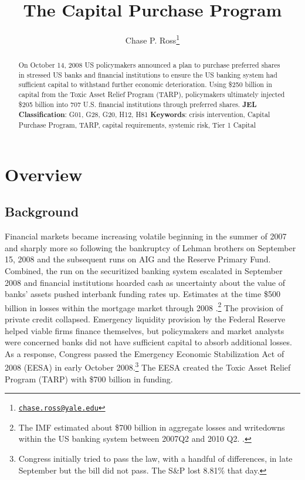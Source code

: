 \documentclass[12pt]{article}
\begin{document}
	\lhead{}
	\rhead{}
	\renewcommand{\headrulewidth}{0.0pt}
	\renewcommand{\footrulewidth}{0.0pt}

\title{The Capital Purchase Program}
\author{Chase P. Ross\thanks{\texttt{\href{mailto:chase.ross@yale.edu}{chase.ross@yale.edu}}}}
\date{}


\maketitle

\begin{abstract}
On October 14, 2008 US policymakers announced a plan to purchase preferred shares in stressed US banks and financial institutions to ensure the US banking system had sufficient capital to withstand further economic deterioration. Using \$250 billion in capital from the Toxic Asset Relief Program (TARP), policymakers ultimately injected \$205 billion into 707 U.S. financial institutions through preferred shares. 
\newline
\newline
\textbf{JEL Classification}: G01, G28, G20, H12, H81
\newline
\textbf{Keywords}: crisis intervention, Capital Purchase Program, TARP,  capital requirements, systemic risk, Tier 1 Capital

\end{abstract}
\newpage
\tableofcontents
\newpage

\section{Overview}

\subsection{Background}

Financial markets became increasing volatile beginning in the summer of 2007 and sharply more so following the bankruptcy of Lehman brothers on September 15, 2008 and the subsequent runs on AIG and the Reserve Primary Fund. Combined, the run on the securitized banking system escalated in September 2008 and financial institutions hoarded cash as uncertainty about the value of banks' assets pushed interbank funding rates up. Estimates at the time \$500 billion in losses within the mortgage market through 2008 \citep{Greenlaw}.\footnote{The IMF estimated about \$700 billion in aggregate losses and writedowns within the US banking system between 2007Q2 and 2010 Q2. \citep{IMF2010}.} The provision of private credit collapsed. Emergency liquidity provision by the Federal Reserve helped viable firms finance themselves, but policymakers and market analysts were concerned banks did not have sufficient capital to absorb additional  losses. As a response, Congress passed the Emergency Economic Stabilization Act of 2008 (EESA) in early October 2008.\footnote{Congress initially tried to pass the law, with a handful of differences, in late September but the bill did not pass. The S\&P lost 8.81\% that day.} The EESA created the Toxic Asset Relief Program (TARP) with \$700 billion in funding.
\end{document}
